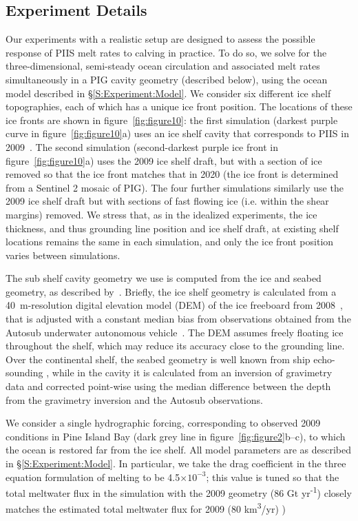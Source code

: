 \documentclass[draft]{agujournal2019}
\begin{document}
\subsection{Experiment Details}
Our experiments with a realistic setup are designed to assess the possible response of PIIS melt rates to calving in practice. To do so, we solve for the three-dimensional, semi-steady ocean circulation and associated melt rates simultaneously in a PIG cavity geometry (described below), using the ocean model described in \S\ref{S:Experiment:Model}. We consider six different ice shelf topographies, each of which has a unique ice front position. The locations of these ice fronts are shown in figure~\ref{fig:figure10}: the first simulation (darkest purple curve in figure~\ref{fig:figure10}a) uses an ice shelf cavity that corresponds to PIIS in 2009~\cite{Dutrieux2014Science}. The second simulation (second-darkest purple ice front in figure~\ref{fig:figure10}a) uses the 2009 ice shelf draft, but with a section of ice removed so that the ice front matches that in 2020 (the ice front is determined from a Sentinel 2 mosaic of PIG). The four further simulations similarly use the 2009 ice shelf draft but with sections of fast flowing ice (i.e. within the shear margins) removed. We stress that, as in the idealized experiments, the ice thickness, and thus grounding line position and ice shelf draft, at existing shelf locations remains the same in each simulation, and only the ice front position varies between simulations. 

The sub shelf cavity geometry we use is computed from the ice and seabed geometry, as described by~. Briefly, the ice shelf geometry is calculated from a 40~m-resolution digital elevation model (DEM) of the ice freeboard from 2008~\cite{Korona2009Photogrammetry}, that is adjusted with a constant median bias from observations obtained from the Autosub underwater autonomous vehicle~\cite{Jenkins2010NatureGeo}. The DEM assumes freely floating ice throughout the shelf, which may reduce its accuracy close to the grounding line. Over the continental shelf, the seabed geometry is well known from ship echo-sounding \cite{Dutrieux2014Science}, while in the cavity it is calculated from an inversion of gravimetry data and corrected point-wise using the median difference between the depth from the gravimetry inversion and the Autosub observations. 

We consider a single hydrographic forcing, corresponding to observed 2009 conditions in Pine Island Bay (dark grey line in figure~\ref{fig:figure2}b--c), to which the ocean is restored far from the ice shelf. All model parameters are as described in \S\ref{S:Experiment:Model}. In particular, we take the drag coefficient in the three equation formulation of melting to be 4.5$\times10^{-3}$; this value is tuned so that the total meltwater flux in the simulation with the 2009 geometry (86 Gt yr\textsuperscript{-1}) closely matches the estimated total meltwater flux for 2009 (80 km\textsuperscript{3}/yr) \cite{Dutrieux2014Science})
\end{document}
